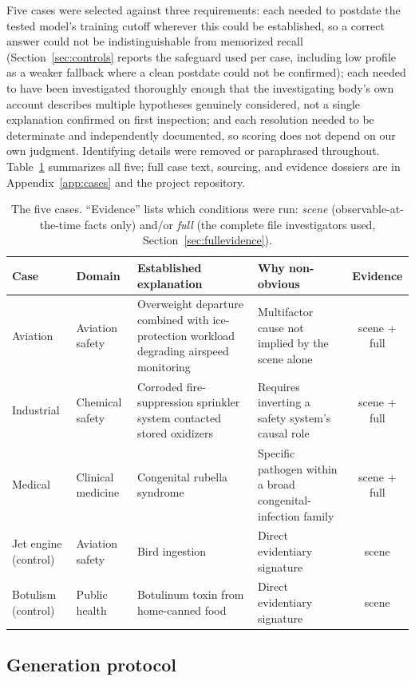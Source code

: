 \documentclass[11pt]{article}
\begin{document}
Five cases were selected against three requirements: each needed to
postdate the tested model's training cutoff wherever this could be
established, so a correct answer could not be indistinguishable from
memorized recall (Section~\ref{sec:controls} reports the safeguard used per
case, including low profile as a weaker fallback where a clean postdate
could not be confirmed); each needed to have been investigated thoroughly
enough that the investigating body's own account describes multiple
hypotheses genuinely considered, not a single explanation confirmed on
first inspection; and each resolution needed to be determinate and
independently documented, so scoring does not depend on our own judgment.
Identifying details were removed or paraphrased throughout. Table~\ref{tab:cases}
summarizes all five; full case text, sourcing, and evidence dossiers are in
Appendix~\ref{app:cases} and the project repository.

\begin{table}[h]
\centering
\small
\begin{tabular}{@{}p{1.7cm}p{2.1cm}p{4.1cm}p{4.1cm}c@{}}
\toprule
Case & Domain & Established explanation & Why non-obvious & Evidence \\
\midrule
Aviation & Aviation safety & Overweight departure combined with ice-protection workload degrading airspeed monitoring & Multifactor cause not implied by the scene alone & scene + full \\
Industrial & Chemical safety & Corroded fire-suppression sprinkler system contacted stored oxidizers & Requires inverting a safety system's causal role & scene + full \\
Medical & Clinical medicine & Congenital rubella syndrome & Specific pathogen within a broad congenital-infection family & scene + full \\
Jet engine (control) & Aviation safety & Bird ingestion & Direct evidentiary signature & scene \\
Botulism (control) & Public health & Botulinum toxin from home-canned food & Direct evidentiary signature & scene \\
\bottomrule
\end{tabular}
\caption{The five cases. ``Evidence'' lists which conditions were run: \emph{scene} (observable-at-the-time facts only) and/or \emph{full} (the complete file investigators used, Section~\ref{sec:fullevidence}).}
\label{tab:cases}
\end{table}

\subsection{Generation protocol}
\label{sec:generation}
\end{document}

